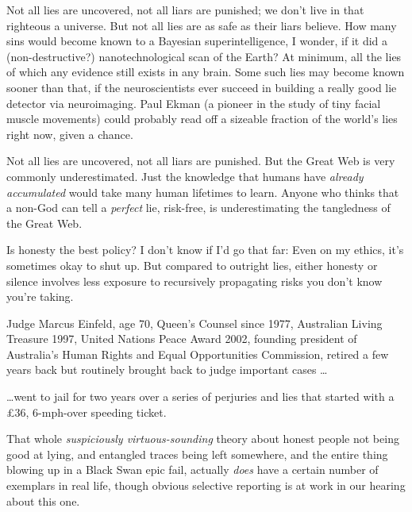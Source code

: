 {
 Not all lies are uncovered, not all liars are punished; we
don't live in that righteous a universe. But not all
lies are as safe as their liars believe. How many sins would become
known to a Bayesian superintelligence, I wonder, if it did a
(non-destructive?) nanotechnological scan of the Earth? At minimum, all
the lies of which any evidence still exists in any brain. Some such
lies may become known sooner than that, if the neuroscientists ever
succeed in building a really good lie detector via neuroimaging. Paul
Ekman (a pioneer in the study of tiny facial muscle movements) could
probably read off a sizeable fraction of the world's
lies right now, given a chance.}

{
 Not all lies are uncovered, not all liars are punished. But the
Great Web is very commonly underestimated. Just the knowledge that
humans have \textit{already accumulated} would take many human
lifetimes to learn. Anyone who thinks that a non-God can tell a
\textit{perfect} lie, risk-free, is underestimating the tangledness of
the Great Web.}

{
 Is honesty the best policy? I don't know if
I'd go that far: Even on my ethics,
it's sometimes okay to shut up. But compared to
outright lies, either honesty or silence involves less exposure to
recursively propagating risks you don't know
you're taking.}

\myendsectiontext


\bigskip


{
 Judge Marcus Einfeld, age 70, Queen's Counsel
since 1977, Australian Living Treasure 1997, United Nations Peace Award
2002, founding president of Australia's Human Rights
and Equal Opportunities Commission, retired a few years back but
routinely brought back to judge important cases \ldots }

{
 \ldots went to jail for two years over a series of perjuries and
lies that started with a £36, 6-mph-over speeding ticket.}

{
 That whole \textit{suspiciously virtuous-sounding} theory about
honest people not being good at lying, and entangled traces being left
somewhere, and the entire thing blowing up in a Black Swan epic fail,
actually \textit{does} have a certain number of exemplars in real life,
though obvious selective reporting is at work in our hearing about this
one.}

\myendsectiontext



